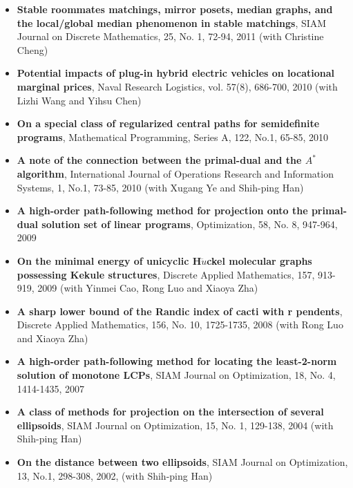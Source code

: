 \documentclass[11pt]{res} %
\begin{document}
\begin{resume}
\begin{itemize} \itemsep 5pt
\item {\bf Stable roommates matchings, mirror posets, median graphs, and the local/global median phenomenon in stable matchings}, SIAM Journal on Discrete Mathematics, 25, No. 1, 72-94, 2011 (with Christine Cheng)

\item {\bf Potential impacts of plug-in hybrid electric vehicles on locational marginal prices}, Naval Research Logistics, vol. 57(8), 686-700, 2010 (with Lizhi Wang and Yihsu Chen)

\item {\bf On a special class of regularized central paths for semidefinite programs}, Mathematical Programming, Series A, 122, No.1, 65-85, 2010

\item {\bf A note of the connection between the
primal-dual and the $A^*$ algorithm}, International Journal of Operations Research and
Information Systems, 1, No.1, 73-85, 2010 (with Xugang Ye and Shih-ping Han)

\item {\bf A high-order path-following method for projection onto the primal-dual
solution set of linear programs}, Optimization, 58, No. 8, 947-964, 2009

\item {\bf On the minimal energy of unicyclic
H$\ddot{u}$ckel molecular graphs possessing Kekule structures}, Discrete Applied Mathematics, 157, 913-919, 2009 (with Yinmei Cao, Rong Luo and Xiaoya Zha)

\item {\bf A sharp lower bound of the Randic index of cacti
with r pendents}, Discrete Applied Mathematics, 156, No. 10, 1725-1735, 2008 (with Rong Luo and Xiaoya Zha)

\item {\bf A high-order path-following method for locating the least-2-norm solution of monotone LCPs}, SIAM Journal on Optimization, 18, No. 4, 1414-1435, 2007

\item {\bf A class of methods for projection on the intersection of
several ellipsoids}, SIAM Journal on Optimization, 15, No. 1, 129-138, 2004 (with Shih-ping Han)
 
\item {\bf On the distance between two ellipsoids}, SIAM Journal
on Optimization, 13, No.1, 298-308, 2002, (with Shih-ping Han)
\end{itemize}

\end{resume}
\end{document}

